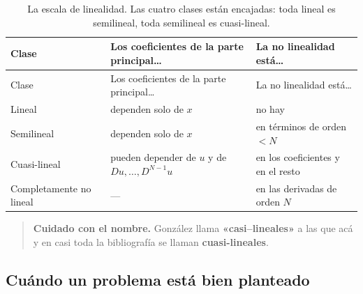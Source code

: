 \documentclass[
  spanish,
  a4paper,
]{scrbook}
\theoremstyle{definition}
\theoremstyle{plain}
\theoremstyle{definition}
\theoremstyle{plain}
\theoremstyle{definition}
\theoremstyle{remark}
\begin{document}
\begin{longtable}[]{@{}
  >{\raggedright\arraybackslash}p{}
  >{\raggedright\arraybackslash}p{}
  >{\raggedright\arraybackslash}p{}@{}}
\caption{La escala de linealidad. Las cuatro clases están encajadas:
toda lineal es semilineal, toda semilineal es
cuasi-lineal.}\tabularnewline
\toprule\noalign{}
\begin{minipage}[b]{\linewidth}\raggedright
Clase
\end{minipage} & \begin{minipage}[b]{\linewidth}\raggedright
Los coeficientes de la parte principal\ldots{}
\end{minipage} & \begin{minipage}[b]{\linewidth}\raggedright
La no linealidad está\ldots{}
\end{minipage} \\
\midrule\noalign{}
\endfirsthead
\toprule\noalign{}
\begin{minipage}[b]{\linewidth}\raggedright
Clase
\end{minipage} & \begin{minipage}[b]{\linewidth}\raggedright
Los coeficientes de la parte principal\ldots{}
\end{minipage} & \begin{minipage}[b]{\linewidth}\raggedright
La no linealidad está\ldots{}
\end{minipage} \\
\midrule\noalign{}
\endhead
\bottomrule\noalign{}
\endlastfoot
Lineal & dependen solo de \(x\) & no hay \\
Semilineal & dependen solo de \(x\) & en términos de orden \(< N\) \\
Cuasi-lineal & pueden depender de \(u\) y de \(Du,\dots,D^{N-1}u\) & en
los coeficientes y en el resto \\
Completamente no lineal & --- & en las derivadas de orden \(N\) \\
\end{longtable}

\begin{quote}
\textbf{Cuidado con el nombre.} González llama \textbf{«casi--lineales»}
a las que acá y en casi toda la bibliografía se llaman
\textbf{cuasi-lineales}.
\end{quote}

\subsection{Cuándo un problema está bien planteado}\label{sec-resumen-3}
\end{document}
